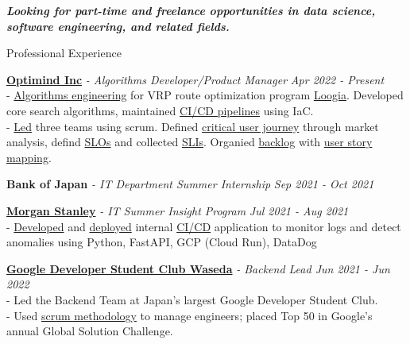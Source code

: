 \documentclass{resume} %
\begin{document}
{\centerline {\em \textbf { Looking for part-time and freelance opportunities in data science, software engineering, and related fields. } } }

\begin{rSection}{Professional Experience}

{\bf \href{https://www.optimind.tech/}{Optimind Inc}} {\textit{- Algorithms Developer/Product Manager }} \hfill {\em Apr 2022 - Present} 
\\- \uline{Algorithms engineering} for VRP route optimization program \href{https://loogia.jp/?_ga=2.72237267.1726635224.1669133714-1962149220.1665458028}{Loogia}. Developed core search algorithms, maintained \uline{CI/CD pipelines} using IaC. 
\\- \uline{Led} three teams using scrum. Defined \uline{critical user journey} through market analysis,  defind \uline{SLOs} and collected \uline{SLIs}. Organied \uline{backlog} with \uline{user story mapping}.


{\bf Bank of Japan}{\textit{ - IT Department Summer Internship}} \hfill {\em Sep 2021 - Oct 2021} 

{\bf \href{https://www.morganstanley.co.jp/ja}{Morgan Stanley}}\textit{ - IT Summer Insight Program} \hfill {\em Jul 2021 - Aug 2021} 
\\- \uline{Developed} and \uline{deployed} internal \uline{CI/CD} application to monitor logs and detect anomalies using Python, FastAPI, GCP (Cloud Run), DataDog

{ \bf\href{https://gdsc.community.dev/waseda-university/}{Google Developer Student Club Waseda}} \textit{ - Backend Lead \hfill {Jun 2021 - Jun 2022}}
\\- Led the Backend Team at Japan's largest Google Developer Student Club. 
\\- Used \uline{scrum methodology} to manage engineers; placed Top 50 in Google's annual Global Solution Challenge. 


\end{rSection}
\end{document}
